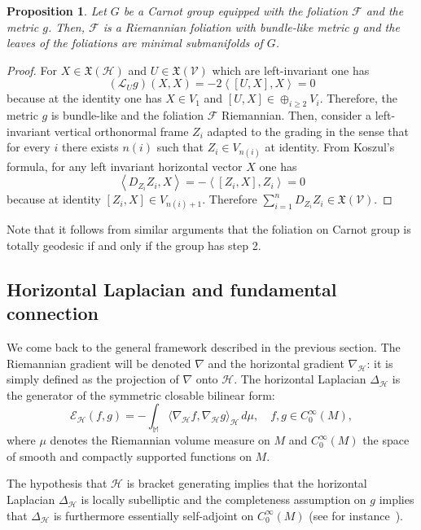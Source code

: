 \documentclass[11pt]{article}
\numberwithin{equation}{section}
\newtheorem{proposition}[theorem]{Proposition}
\newcommand{\bM}{\mathbb M}
\newcommand{\Ho}{\mathcal H}
\newcommand{\V}{\mathcal V}
\begin{document}
\begin{proposition}\label{Example Carnot}
Let $G$ be a Carnot group equipped with the foliation $\mathcal{F}$ and the metric $g$. Then, $\mathcal F$ is a Riemannian foliation with bundle-like metric $g$ and the leaves of the foliations are minimal submanifolds of $G$. 
\end{proposition}

\begin{proof}
 For $X \in \mathfrak{X}(\Ho)$ and $U \in \mathfrak{X}(\V)$ which are left-invariant one has
\[
(\mathcal{L}_U g)(X, X)=-2 \left\langle [U,X], X \right\rangle =0
\]
because at the identity one has $X \in V_1$ and $[U,X] \in \oplus_{i \ge 2} V_i$. Therefore, the metric $g$ is bundle-like and the foliation $\mathcal F$ Riemannian. Then, consider a left-invariant vertical orthonormal frame $Z_i$ adapted to the grading in the sense that for every $i$ there exists $n(i)$ such that $Z_i \in V_{n(i)}$ at  identity. From Koszul's formula, for any left invariant horizontal vector $X$  one has
\[
\left\langle D_{Z_i} Z_i ,X \right\rangle=-\left\langle [Z_i,X],Z_i \right\rangle=0
\]
because at identity $[Z_i,X] \in V_{n(i)+1}$. Therefore $\sum_{i=1}^n D_{Z_i} Z_i \in \mathfrak{X}(\V)$.
\end{proof}

Note that it follows from similar arguments that the foliation on Carnot group is totally geodesic if and only if the group has step 2.

\subsection{Horizontal Laplacian and fundamental connection}

We  come back to the general framework described in the previous section. The Riemannian gradient will be denoted $\nabla$ and the horizontal gradient $\nabla_\Ho$: it is simply defined as the projection of $\nabla$ onto $\mathcal{H}$. The horizontal Laplacian $\Delta_\Ho$ is the generator of the symmetric closable bilinear form:
\[
\mathcal{E}_{\mathcal{H}} (f,g) 
=-\int_\bM \langle \nabla_\mathcal{H} f , \nabla_\mathcal{H} g \rangle_{\mathcal{H}} \,d\mu, 
\quad f,g \in C_0^\infty(M),
\]
where $\mu$ denotes the Riemannian volume measure on $M$ and  $C_0^\infty(M)$ the space of smooth and compactly supported functions on $M$.


The hypothesis that $\mathcal{H}$ is bracket generating implies that the horizontal Laplacian $\Delta_{\mathcal{H}}$ is locally subelliptic and the completeness assumption on $g$ implies that $\Delta_{\mathcal{H}}$ is furthermore essentially self-adjoint on $C_0^\infty(M)$ (see for instance~\cite{BaudoinEMS2014}).
\end{document}
